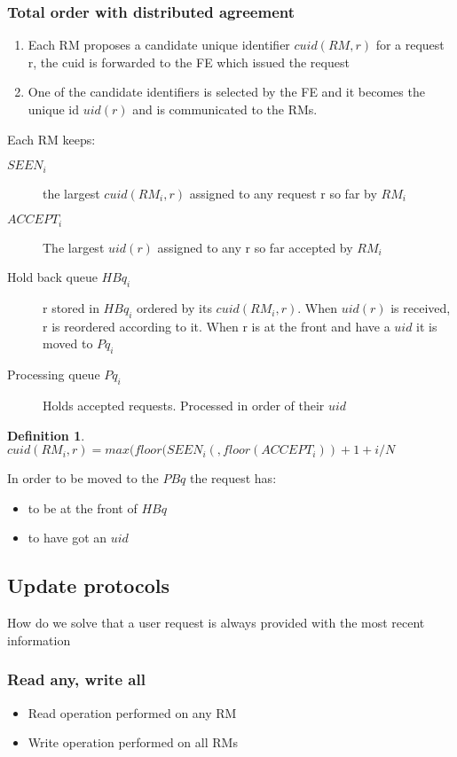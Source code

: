 \documentclass[a4paper]{article}
\newtheorem{definition}{Definition}
\begin{document}
\subsubsection{Total order with distributed agreement}
\begin{enumerate}
		\item Each RM proposes a candidate unique identifier $cuid(RM, r)$ for a
				request r, the cuid is forwarded to the FE which issued the
				request
		\item One of the candidate identifiers is selected by the FE and it
				becomes the unique id $uid(r)$ and is communicated to the RMs.
\end{enumerate}
Each RM keeps:
\begin{description}
		\item[$SEEN_i$] the largest $cuid(RM_i,r)$ assigned to any request r so
				far by $RM_i$
		\item[$ACCEPT_i$] The largest $uid(r)$ assigned to any r so far accepted
				by $RM_i$
		\item [Hold back queue $HBq_i$] r stored in $HBq_i$ ordered by its
				$cuid(RM_i,r)$. When $uid(r)$ is received, r is reordered
				according to it. When r is at the front and have a $uid$ it is
				moved to $Pq_i$
		\item[Processing queue $Pq_i$] Holds accepted requests. Processed in
				order of their $uid$
\end{description} 
\begin{definition}
		$cuid(RM_i,r) = max(floor(SEEN_i(, floor(ACCEPT_i))+1+i/N$
\end{definition}
In order to be moved to the $PBq$ the request has:
\begin{itemize}
		\item to be at the front of $HBq$
		\item to have got an $uid$
\end{itemize}
\subsection{Update protocols}
How do we solve that a user request is always provided with the most recent
information
\subsubsection{Read any, write all}
\begin{itemize}
		\item Read operation performed on any RM
		\item Write operation performed on all RMs
\end{itemize}
\end{document}
